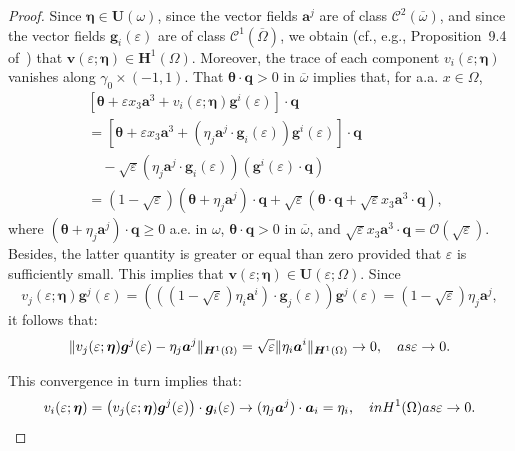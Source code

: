 \documentclass{amsart}
\begin{document}
\begin{proof}
Since $\bm{\eta} \in \bm{U}(\omega)$, since the vector fields $\bm{a}^j$ are of class $\bm{\mathcal{C}}^2(\overline{\omega})$, and since the vector fields $\bm{g}_i(\varepsilon)$ are of class $\bm{\mathcal{C}}^1(\overline{\Omega})$, we obtain  (cf., e.g., Proposition~9.4 of~\cite{Brez11}) that $
\bm{v}(\varepsilon;\bm{\eta}) \in \bm{H}^1(\Omega)$. Moreover, the trace of each component $v_i(\varepsilon;\bm{\eta})$ vanishes along $\gamma_0 \times (-1,1)$. That $\bm{\theta} \cdot\bm{q}>0$ in $\overline{\omega}$ implies that, for a.a. $x\in\Omega$,
\begin{equation*}
	\begin{aligned}
		&\left[\bm{\theta}+\varepsilon x_3 \bm{a}^3+v_i(\varepsilon;\bm{\eta})\bm{g}^i(\varepsilon)\right] \cdot\bm{q}\\
		&=\left[\bm{\theta}+\varepsilon x_3 \bm{a}^3+(\eta_j \bm{a}^j \cdot \bm{g}_i(\varepsilon))\bm{g}^i(\varepsilon)\right]\cdot\bm{q}\\
		&\quad-\sqrt{\varepsilon}(\eta_j\bm{a}^j \cdot\bm{g}_i(\varepsilon)) (\bm{g}^i(\varepsilon) \cdot\bm{q})\\
		&=(1-\sqrt{\varepsilon})\left(\bm{\theta}+\eta_j\bm{a}^j\right) \cdot\bm{q} +\sqrt{\varepsilon}(\bm{\theta}\cdot\bm{q}+\sqrt{\varepsilon} x_3 \bm{a}^3\cdot\bm{q}),
	\end{aligned}
\end{equation*}
where $(\bm{\theta}+\eta_j\bm{a}^j)\cdot\bm{q}\ge 0$ a.e. in $\omega$, $\bm{\theta}\cdot\bm{q}>0$ in $\overline{\omega}$, and $\sqrt{\varepsilon}x_3 \bm{a}^3\cdot\bm{q}=\mathcal{O}(\sqrt{\varepsilon})$.
Besides, the latter quantity is greater or equal than zero provided that $\varepsilon$ is sufficiently small. This implies that $\bm{v}(\varepsilon;\bm{\eta}) \in \bm{U}(\varepsilon;\Omega)$.
Since
\begin{equation*}
v_j(\varepsilon;\bm{\eta}) \bm{g}^j(\varepsilon) = \left(\left( (1-\sqrt{\varepsilon}) \eta_i \bm{a}^i\right) \cdot \bm{g}_j (\varepsilon)\right)\bm{g}^j(\varepsilon) = (1-\sqrt{\varepsilon})\eta_j\bm{a}^j, 
\end{equation*}
it follows that:
\begin{equation*}
	\|v_j(\varepsilon;\bm{\eta})\bm{g}^j (\varepsilon)-\eta_j \bm{a}^j\|_{\bm{H}^1(\Omega)} = \sqrt{\varepsilon}\|\eta_i \bm{a}^i\|_{\bm{H}^1(\Omega)} \to 0,\quad \textup{ as } \varepsilon \to 0.
\end{equation*}

This convergence in turn implies that:
\begin{equation*}
	v_i(\varepsilon;\bm{\eta})=\left(v_j (\varepsilon;\bm{\eta}) \bm{g}^j(\varepsilon)\right) \cdot \bm{g}_i(\varepsilon) \to (\eta_j\bm{a}^j) \cdot \bm{a}_i = \eta_i,\quad \textup{ in } H^1(\Omega) \textup{ as } \varepsilon \to 0.
\end{equation*}


\end{proof}
\end{document}
